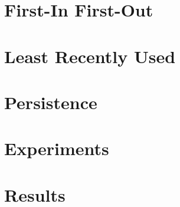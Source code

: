 \section{First-In First-Out} %
\label{sec:fifo}


\section{Least Recently Used} %
\label{sec:lru}


\section{Persistence} %
\label{sec:persistence}


\section{Experiments} %
\label{sec:experiments_eviction}


\section{Results} %
\label{sec:results_eviction}

